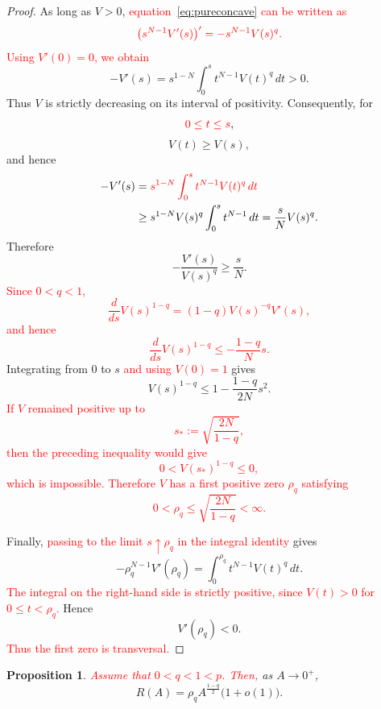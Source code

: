 \documentclass[11pt]{article}
\newtheorem{proposition}[theorem]{Proposition}
\theoremstyle{definition}
\begin{document}
\begin{proof}
As long as $V>0$, \textcolor{red}{equation~\eqref{eq:pureconcave}
can be written as}
\[
\textcolor{red}{\bigl(s^{N-1}V'(s)\bigr)'
=
-s^{N-1}V(s)^q.}
\]
\textcolor{red}{Using $V'(0)=0$, we obtain}
\[
-V'(s)
=
s^{1-N}
\int_0^s t^{N-1}V(t)^q\,dt>0.
\]
Thus $V$ is strictly decreasing on its interval of positivity.
Consequently, for
\[
\textcolor{red}{0\leq t\leq s},
\]
\[
V(t)\geq V(s),
\]
and hence
\[
\begin{aligned}
-V'(s)
&=
\textcolor{red}{s^{1-N}
\int_0^s t^{N-1}V(t)^q\,dt}\\
&\geq
s^{1-N}V(s)^q
\int_0^s t^{N-1}\,dt
=
\frac{s}{N}V(s)^q.
\end{aligned}
\]
Therefore
\[
-\frac{V'(s)}{V(s)^q}
\geq
\frac{s}{N}.
\]
\textcolor{red}{Since $0<q<1$,
\[
\frac{d}{ds}V(s)^{1-q}
=
(1-q)V(s)^{-q}V'(s),
\]
and hence
\[
\frac{d}{ds}V(s)^{1-q}
\leq
-\frac{1-q}{N}s.
\]}
Integrating from $0$ to $s$ \textcolor{red}{and using $V(0)=1$} gives
\[
V(s)^{1-q}
\leq
1-\frac{1-q}{2N}s^2.
\]
\textcolor{red}{If $V$ remained positive up to
\[
s_*:=\sqrt{\frac{2N}{1-q}},
\]
then the preceding inequality would give
\[
0<V(s_*)^{1-q}\leq0,
\]
which is impossible. Therefore $V$ has a first positive zero
$\rho_q$ satisfying
\[
0<\rho_q\leq
\sqrt{\frac{2N}{1-q}}<\infty.
\]}

Finally, \textcolor{red}{passing to the limit $s\uparrow\rho_q$ in the
integral identity} gives
\[
-\rho_q^{N-1}V'(\rho_q)
=
\int_0^{\rho_q}
t^{N-1}V(t)^q\,dt.
\]
\textcolor{red}{The integral on the right-hand side is strictly
positive, since $V(t)>0$ for $0\leq t<\rho_q$.} Hence
\[
V'(\rho_q)<0.
\]
\textcolor{red}{Thus the first zero is transversal.}
\end{proof}


\begin{proposition}
\label{prop:smallasymptotic}
\textcolor{red}{Assume that $0<q<1<p$. Then,} as $A\to0^+$,
\begin{equation}
\label{eq:Rsmall}
R(A)
=
\rho_q
A^{\frac{1-q}{2}}
\bigl(1+o(1)\bigr).
\end{equation}
\end{proposition}
\end{document}
